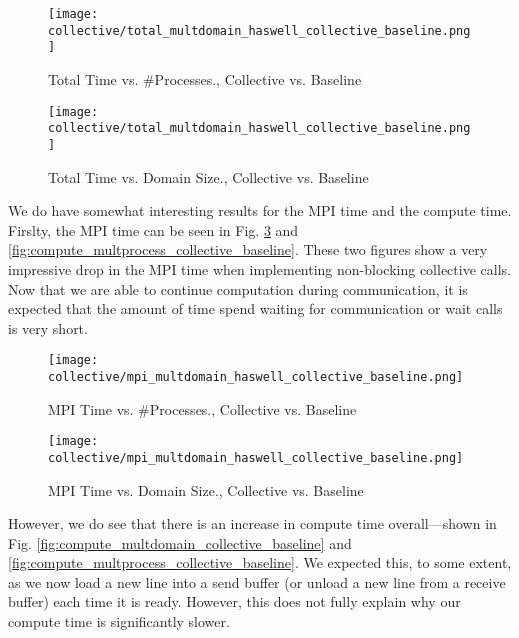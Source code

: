 \begin{enumerate}
	\begin{figure}[h] %
		\centering
		\texttt{[image: collective/total\_multdomain\_haswell\_collective\_baseline.png]}
		\caption{Total Time vs. \#Processes., Collective vs. Baseline}
		\label{fig:total_multdomain_collective_baseline}
	\end{figure}	
	
	\begin{figure}[h] %
		\centering
		\texttt{[image: collective/total\_multdomain\_haswell\_collective\_baseline.png]}
		\caption{Total Time vs. Domain Size., Collective vs. Baseline}
		\label{fig:total_multprocess_collective_baseline}
	\end{figure}	
    
    We do have somewhat interesting results for the MPI time and the compute time.
    Firslty, the MPI time can be seen in Fig. \ref{fig:mpi_multdomain_collective_baseline} and
	\ref{fig:compute_multprocess_collective_baseline}. These two figures show a very impressive
	drop in the MPI time when implementing non-blocking collective calls. Now that we are able
	to continue computation during communication, it is expected that the amount of time spend
	waiting for communication or wait calls is very short.
	
	\begin{figure}[h] %
		\centering
		\texttt{[image: collective/mpi\_multdomain\_haswell\_collective\_baseline.png]}
		\caption{MPI Time vs. \#Processes., Collective vs. Baseline}
		\label{fig:mpi_multdomain_collective_baseline}
	\end{figure}	
	
	\begin{figure}[h] %
		\centering
		\texttt{[image: collective/mpi\_multdomain\_haswell\_collective\_baseline.png]}
		\caption{MPI Time vs. Domain Size., Collective vs. Baseline}
		\label{fig:mpi_multprocess_collective_baseline}
	\end{figure}	
	
 	However, we do see that there is an increase in compute time 
 	overall---shown in Fig. \ref{fig:compute_multdomain_collective_baseline} and
	\ref{fig:compute_multprocess_collective_baseline}. We expected this, to some extent, as we now load a new 
	line into a send buffer (or unload a new line from a receive buffer) each time it is ready. However,
	this does not fully explain why our compute time is significantly slower.
	

\end{enumerate}
